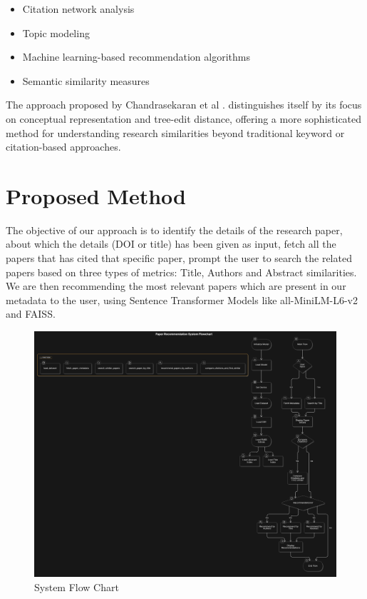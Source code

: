 \documentclass[runningheads]{llncs}
\begin{document}
\begin{itemize}
    \item Citation network analysis
    \item Topic modeling
    \item Machine learning-based recommendation algorithms
    \item Semantic similarity measures
\end{itemize}
The approach proposed by Chandrasekaran et al \cite{r1}. distinguishes itself by its focus on conceptual representation and tree-edit distance, offering a more sophisticated method for understanding research similarities beyond traditional keyword or citation-based approaches.

\section{\textbf{Proposed Method}}

The objective of our approach is to identify the details of the research paper, about which the details (DOI or title) has been given as input, fetch all the papers that has cited that specific paper, prompt the user to search the related papers based on three types of metrics: Title, Authors and Abstract similarities. We are then recommending the most relevant papers which are present in our metadata to the user, using Sentence Transformer Models like all-MiniLM-L6-v2 and FAISS.
\begin{figure}
    \centering
    \includegraphics[width=1\linewidth]{System flow.png}
    \caption{System Flow Chart}
    \label{fig1}
\end{figure}
\end{document}

